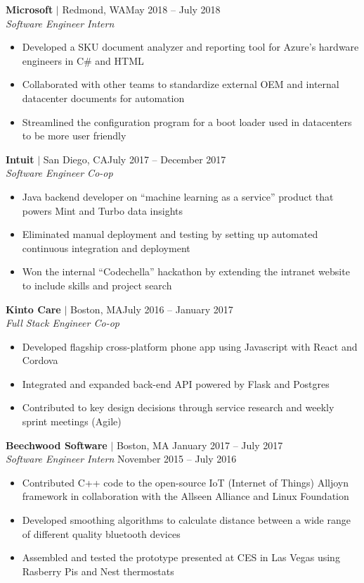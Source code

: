 \documentclass[overlapped,line]{res}
\begin{document}
\begin{resume}
\textbf{Microsoft} $|$ Redmond, WA\hfill May 2018 \--- July 2018\\
{\sl Software Engineer Intern}
\begin{itemize} \itemsep -2pt
	\item Developed a SKU document analyzer and reporting tool for Azure's hardware engineers in C\# and HTML
	\item Collaborated with other teams to standardize external OEM and internal datacenter documents for automation
	\item Streamlined the configuration program for a boot loader used in datacenters to be more user friendly
\end{itemize}

\textbf{Intuit} $|$ San Diego, CA\hfill July 2017 \--- December 2017\\
{\sl Software Engineer Co-op}
\begin{itemize} \itemsep -2pt
	\item Java backend developer on ``machine learning as a service'' product that powers Mint and Turbo data insights
	\item Eliminated manual deployment and testing by setting up automated continuous integration and deployment
	\item Won the internal ``Codechella'' hackathon by extending the intranet website to include skills and project search
\end{itemize}

\textbf{Kinto Care} $|$ Boston, MA\hfill July 2016 \--- January 2017\\
{\sl Full Stack Engineer Co-op}
\begin{itemize} \itemsep -2pt
	\item Developed flagship cross-platform phone app using Javascript with React and Cordova
	\item Integrated and expanded back-end API powered by Flask and Postgres
	\item Contributed to key design decisions through service research and weekly sprint meetings (Agile)
\end{itemize}

\textbf{Beechwood Software} $|$ Boston, MA \hfill January 2017 \--- July 2017\\
{\sl Software Engineer Intern} \hfill November 2015 \--- July 2016
\begin{itemize}  \itemsep -2pt
	\item Contributed C++ code to the open-source IoT (Internet of Things) Alljoyn framework in collaboration with the Allseen Alliance and Linux Foundation
	\item Developed smoothing algorithms to calculate distance between a wide range of different quality bluetooth devices
	\item Assembled and tested the prototype presented at CES in Las Vegas using Rasberry Pis and Nest thermostats
\end{itemize}
\noindent\makebox[7.15in]{\rule{7.15in}{0.4pt}}



\end{resume}
\end{document}
